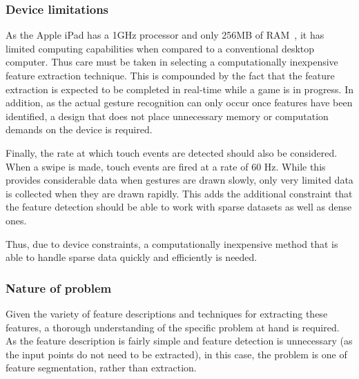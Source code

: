 \subsubsection{Device limitations}
As the Apple iPad has a 1GHz processor and only 256MB of RAM~\citep{Appl10}, it has limited computing capabilities when compared to a conventional desktop computer. Thus care must be taken in selecting a computationally inexpensive feature extraction technique. This is compounded by the fact that the feature extraction is expected to be completed in real-time while a game is in progress. In addition, as the actual gesture recognition can only occur once features have been identified, a design that does not place unnecessary memory or computation demands on the device is required.

Finally, the rate at which touch events are detected should also be considered. When a swipe is made, touch events are fired at a rate of 60 Hz. While this provides considerable data when gestures are drawn slowly, only very limited data is collected when they are drawn rapidly. This adds the additional constraint that the feature detection should be able to work with sparse datasets as well as dense ones.

Thus, due to device constraints, a computationally inexpensive method that is able to handle sparse data quickly and efficiently is needed.

\subsubsection{Nature of problem}
Given the variety of feature descriptions and techniques for extracting these features, a thorough understanding of the specific problem at hand is required. As the feature description is fairly simple and feature detection is unnecessary (as the input points do not need to be extracted), in this case, the problem is one of feature segmentation, rather than extraction.

